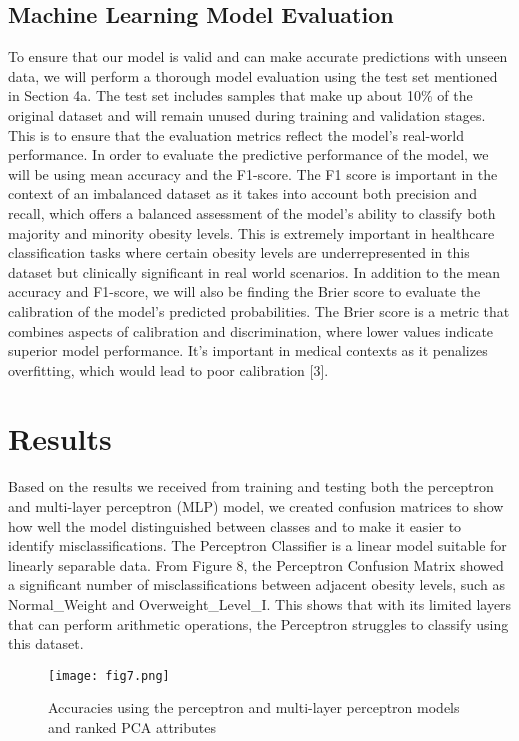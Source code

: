 \documentclass[conference]{IEEEtran}
\begin{document}
\subsection{Machine Learning Model Evaluation}
To ensure that our model is valid and can make accurate predictions with unseen data, we will perform a thorough model evaluation using the test set mentioned in Section 4a. The test set includes samples that make up about 10\% of the original dataset and will remain unused during training and validation stages.  This is to ensure that the evaluation metrics reflect the model’s real-world performance. In order to evaluate the predictive performance of the  model, we will be using mean accuracy and the F1-score. The F1 score is important in the context of an imbalanced dataset as it takes into account both precision and recall, which offers a balanced assessment of the model’s ability to classify both majority and minority obesity levels. This is extremely important in healthcare classification tasks where certain obesity levels are underrepresented in this dataset but clinically significant in real world scenarios.
In addition to the mean accuracy and F1-score, we will also be finding the Brier score to evaluate the calibration of the model’s predicted probabilities. The Brier score is a metric that combines aspects of calibration and discrimination, where lower values indicate superior model performance. It’s important in medical contexts as it penalizes overfitting, which would lead to poor calibration [3].

\section{Results}
Based on the results we received from training and testing both the perceptron and multi-layer perceptron (MLP)  model, we created confusion matrices to show how well the model distinguished between classes and to make it easier to identify misclassifications. The Perceptron Classifier is a linear model suitable for linearly separable data. From Figure 8, the Perceptron Confusion Matrix showed a significant number of misclassifications between adjacent obesity levels, such as Normal\_Weight and Overweight\_Level\_I. This shows that with its limited layers that can perform arithmetic operations, the Perceptron struggles to classify using this dataset. 


\begin{figure}[htbp]
\centering
\texttt{[image: fig7.png]}
\caption{Accuracies using the perceptron and multi-layer perceptron models and ranked PCA attributes}
\label{Table 3.1}
\end{figure}
\end{document}
